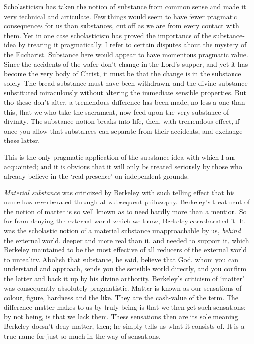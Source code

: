 \documentclass[]{article}
\begin{document}
Scholasticism has taken the notion of substance from common sense and made it very technical and articulate. Few things would seem to have fewer pragmatic consequences for us than substances, cut off as we are from every contact with them. Yet in one case scholasticism has proved the importance of the substance-idea by treating it pragmatically. I refer to certain disputes about the mystery of the Eucharist. Substance here would appear to have momentous pragmatic value. Since the accidents of the wafer don't change in the Lord's supper, and yet it has become the very body of Christ, it must be that the change is in the substance solely. The bread-substance must have been withdrawn, and the divine substance substituted miraculously without altering the immediate sensible properties. But tho these don't alter, a tremendous difference has been made, no less a one than this, that we who take the sacrament, now feed upon the very substance of divinity. The substance-notion breaks into life, then, with tremendous effect, if once you allow that substances can separate from their accidents, and exchange these latter.

This is the only pragmatic application of the substance-idea with which I am acquainted; and it is obvious that it will only be treated seriously by those who already believe in the `real presence' on independent grounds.

\emph{Material substance} was criticized by Berkeley with such telling effect that his name has reverberated through all subsequent philosophy. Berkeley's treatment of the notion of matter is so well known as to need hardly more than a mention. So far from denying the external world which we know, Berkeley corroborated it. It was the scholastic notion of a material substance unapproachable by us, \emph{behind} the external world, deeper and more real than it, and needed to support it, which Berkeley maintained to be the most effective of all reducers of the external world to unreality. Abolish that substance, he said, believe that God, whom you can understand and approach, sends you the sensible world directly, and you confirm the latter and back it up by his divine authority. Berkeley's criticism of `matter' was consequently absolutely pragmatistic. Matter is known as our sensations of colour, figure, hardness and the like. They are the cash-value of the term. The difference matter makes to us by truly being is that we then get such sensations; by not being, is that we lack them. These sensations then are its sole meaning. Berkeley doesn't deny matter, then; he simply tells us what it consists of. It is a true name for just so much in the way of sensations.
\end{document}
